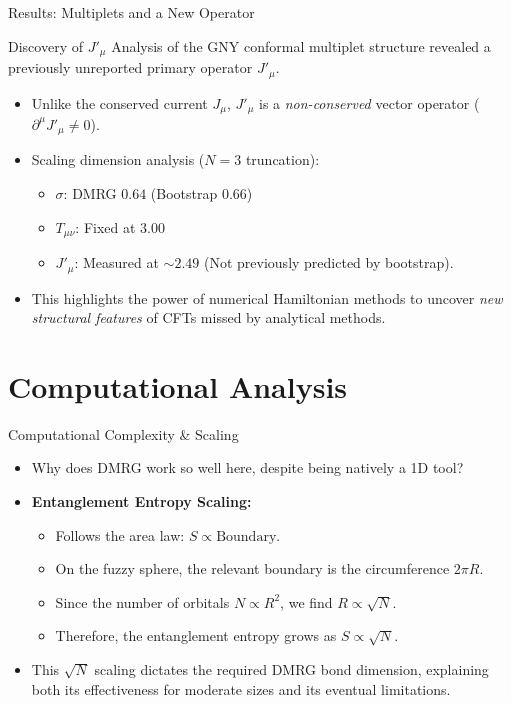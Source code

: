 \documentclass[aspectratio=169]{beamer}
\begin{document}
\begin{frame}{Results: Multiplets and a New Operator}
    \begin{block}{Discovery of $J'_\mu$}
        Analysis of the GNY conformal multiplet structure revealed a previously unreported primary operator $J'_\mu$.
    \end{block}
    \vspace{0.2cm}
    \begin{itemize}
        \item Unlike the conserved current $J_\mu$, $J'_\mu$ is a \textit{non-conserved} vector operator ($\partial^\mu J'_\mu \neq 0$).
        \item Scaling dimension analysis ($N=3$ truncation):
            \begin{itemize}
                \item $\sigma$: DMRG $0.64$ (Bootstrap $0.66$)
                \item $T_{\mu\nu}$: Fixed at $3.00$
                \item $J'_\mu$: Measured at $\sim 2.49$ (Not previously predicted by bootstrap).
            \end{itemize}
        \item This highlights the power of numerical Hamiltonian methods to uncover \textit{new structural features} of CFTs missed by analytical methods.
    \end{itemize} %
\end{frame}

\section{Computational Analysis}
\begin{frame}{Computational Complexity \& Scaling}
    \begin{itemize}
        \item Why does DMRG work so well here, despite being natively a 1D tool?
        \item \textbf{Entanglement Entropy Scaling:}
        \begin{itemize}
            \item Follows the area law: $S \propto \text{Boundary}$.
            \item On the fuzzy sphere, the relevant boundary is the circumference $2\pi R$.
            \item Since the number of orbitals $N \propto R^2$, we find $R \propto \sqrt{N}$.
            \item Therefore, the entanglement entropy grows as $S \propto \sqrt{N}$.
        \end{itemize}
        \item This $\sqrt{N}$ scaling dictates the required DMRG bond dimension, explaining both its effectiveness for moderate sizes and its eventual limitations.
    \end{itemize}
\end{frame}
\end{document}
